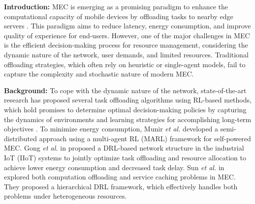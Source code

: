 \documentclass[12pt]{article}
\begin{document}
\vspace{0mm}
\noindent\large\textbf{Introduction: }
\small
MEC is emerging as a promising paradigm to enhance the computational capacity of mobile devices by offloading tasks to nearby edge servers \cite{mao2017survey}. This paradigm aims to reduce latency, energy consumption, and improve quality of experience for end-users. However, one of the major challenges in MEC is the efficient decision-making process for resource management, considering the dynamic nature of the network, user demands, and limited resources. Traditional offloading strategies, which often rely on heuristic or single-agent models, fail to capture the complexity and stochastic nature of modern MEC. \\\vspace{-4mm}


\noindent\large\textbf{Background: }\small
To cope with the dynamic nature of the network, state-of-the-art research has proposed several task offloading algorithms using RL-based methods, which hold promises to determine optimal decision-making policies by capturing the dynamics of environments and learning strategies for accomplishing long-term objectives \cite{arulkumaran2017deep}. To minimize energy consumption, Munir \textit{et al.} \cite{munir2021multi} developed a semi-distributed approach using a multi-agent RL (MARL) framework for self-powered MEC. Gong \textit{et al.} in \cite{gong2022edge} proposed a DRL-based network structure in the industrial IoT (IIoT) systems to jointly optimize task offloading and resource allocation to achieve lower energy consumption and decreased task delay. Sun \textit{et al.} in \cite{sun2024hierarchical} explored both computation offloading and service caching problems in MEC. They proposed a hierarchical DRL framework, which effectively handles both problems under heterogeneous resources.


\end{document}
